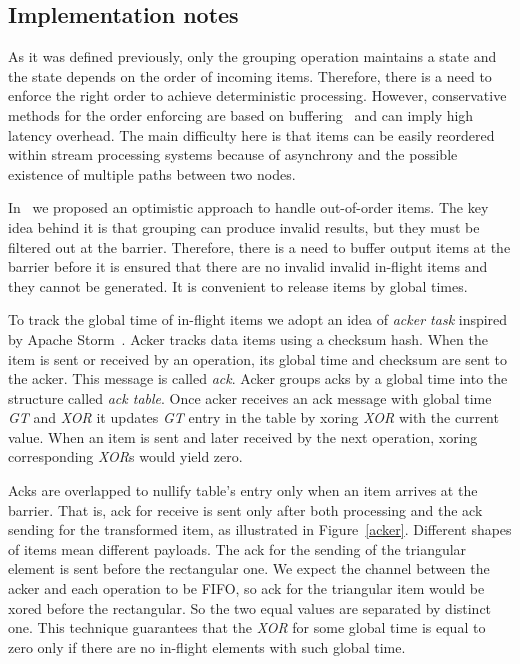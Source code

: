 \subsection{Implementation notes}

As it was defined previously, only the grouping operation maintains a state and the state depends on the order of incoming items. Therefore, there is a need to enforce the right order to achieve deterministic processing. However, conservative methods for the order enforcing are based on buffering~\cite{Li:2008:OPN:1453856.1453890} and can imply high latency overhead. The main difficulty here is that items can be easily reordered within stream processing systems because of asynchrony and the possible existence of multiple paths between two nodes. 

In~\cite{we2018seim} we proposed an optimistic approach to handle out-of-order items. The key idea behind it is that grouping can produce invalid results, but they must be filtered out at the barrier. Therefore, there is a need to buffer output items at the barrier before it is ensured that there are no invalid invalid in-flight items and they cannot be generated. It is convenient to release items by global times.

To track the global time of in-flight items we adopt an idea of {\it acker task} inspired by Apache Storm~\cite{apache:storm}. Acker tracks data items using a checksum hash. When the item is sent or received by an operation, its global time and checksum are sent to the acker. This message is called {\it ack}. Acker groups acks by a global time into the structure called {\it ack table}. Once acker receives an ack message with global time {\it GT} and {\it XOR} it updates {\it GT} entry in the table by xoring {\it XOR} with the current value. When an item is sent and later received by the next operation, xoring corresponding {\it XOR}s would yield zero.

Acks are overlapped to nullify table's entry only when an item arrives at the barrier. That is, ack for receive is sent only after both processing and the ack sending for the transformed item, as illustrated in Figure~\ref{acker}. Different shapes of items mean different payloads. The ack for the sending of the triangular element is sent before the rectangular one. We expect the channel between the acker and each operation to be FIFO, so ack for the triangular item would be xored before the rectangular. So the two equal values are separated by distinct one. This technique guarantees that the {\it XOR} for some global time is equal to zero only if there are no in-flight elements with such global time.

